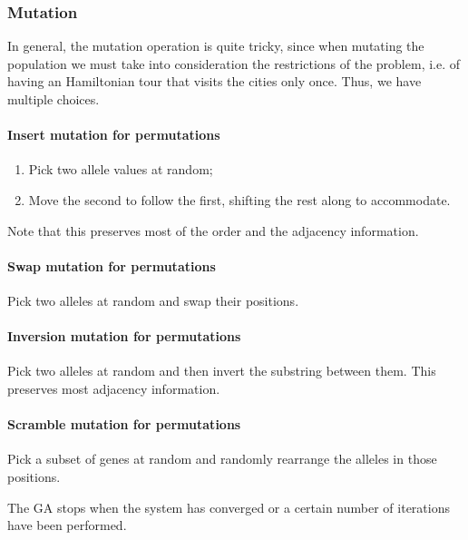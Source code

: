 \subsubsection{Mutation}
In general, the mutation operation  is quite tricky, since when mutating the population we must take into consideration the restrictions of the problem, i.e. of having an Hamiltonian tour that visits the cities only once. Thus, we have multiple choices.

\newpage
\paragraph{Insert mutation for permutations}
\begin{enumerate}
    \item Pick two allele values at random;
    \item Move the second to follow the first, shifting the rest along to accommodate.
\end{enumerate}

Note that this preserves most of the order and the adjacency information.

\paragraph{Swap mutation for permutations}
Pick two alleles at random and swap their positions.


\paragraph{Inversion mutation for permutations}
Pick two alleles at random and then invert the substring between them.
This preserves most adjacency information.

\paragraph{Scramble mutation for permutations}
Pick a subset of genes at random and randomly rearrange the alleles in those positions.



The GA stops when the system has converged or a certain number of iterations have been performed.